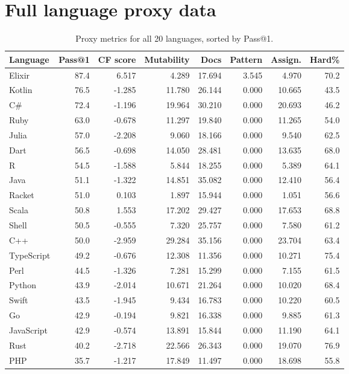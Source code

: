 \documentclass[11pt]{article}
\makeatletter
\newcommand{\passatone}{Pass@1}
\makeatother
\begin{document}
\section{Full language proxy data}
\label{app:proxy}

\begin{table}[H]
\centering
\caption{Proxy metrics for all 20 languages, sorted by \passatone{}.}
\label{tab:proxyfull}
\small
\begin{tabular}{lrrrrrrr}
\toprule
Language & \passatone{} & CF score & Mutability & Docs & Pattern & Assign. & Hard\% \\
\midrule
Elixir & 87.4 & 6.517 & 4.289 & 17.694 & 3.545 & 4.970 & 70.2 \\
Kotlin & 76.5 & -1.285 & 11.780 & 26.144 & 0.000 & 10.665 & 43.5 \\
C\# & 72.4 & -1.196 & 19.964 & 30.210 & 0.000 & 20.693 & 46.2 \\
Ruby & 63.0 & -0.678 & 11.297 & 19.840 & 0.000 & 11.265 & 54.0 \\
Julia & 57.0 & -2.208 & 9.060 & 18.166 & 0.000 & 9.540 & 62.5 \\
Dart & 56.5 & -0.698 & 14.050 & 28.481 & 0.000 & 13.635 & 68.0 \\
R & 54.5 & -1.588 & 5.844 & 18.255 & 0.000 & 5.389 & 64.1 \\
Java & 51.1 & -1.322 & 14.851 & 35.082 & 0.000 & 12.410 & 56.4 \\
Racket & 51.0 & 0.103 & 1.897 & 15.944 & 0.000 & 1.051 & 56.6 \\
Scala & 50.8 & 1.553 & 17.202 & 29.427 & 0.000 & 17.653 & 68.8 \\
Shell & 50.5 & -0.555 & 7.320 & 25.757 & 0.000 & 7.580 & 61.2 \\
C++ & 50.0 & -2.959 & 29.284 & 35.156 & 0.000 & 23.704 & 63.4 \\
TypeScript & 49.2 & -0.676 & 12.308 & 11.356 & 0.000 & 10.271 & 75.4 \\
Perl & 44.5 & -1.326 & 7.281 & 15.299 & 0.000 & 7.155 & 61.5 \\
Python & 43.9 & -2.014 & 10.671 & 21.264 & 0.000 & 10.020 & 68.4 \\
Swift & 43.5 & -1.945 & 9.434 & 16.783 & 0.000 & 10.220 & 60.5 \\
Go & 42.9 & -0.194 & 9.821 & 16.338 & 0.000 & 9.885 & 61.3 \\
JavaScript & 42.9 & -0.574 & 13.891 & 15.844 & 0.000 & 11.190 & 64.1 \\
Rust & 40.2 & -2.718 & 22.566 & 26.343 & 0.000 & 19.070 & 76.9 \\
PHP & 35.7 & -1.217 & 17.849 & 11.497 & 0.000 & 18.698 & 55.8 \\
\bottomrule
\end{tabular}
\end{table}
\end{document}
